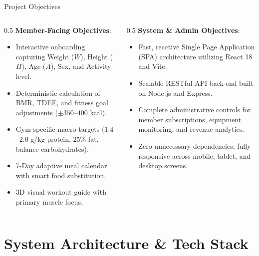 \documentclass[aspectratio=169,10pt]{beamer}
\begin{document}
\begin{frame}{Project Objectives}
  \begin{columns}[T]
    \begin{column}{0.5\textwidth}
      \textbf{Member-Facing Objectives}:
      \begin{itemize}
        \item Interactive onboarding capturing Weight ($W$), Height ($H$), Age ($A$), Sex, and Activity level.
        \item Deterministic calculation of BMR, TDEE, and fitness goal adjustments ($\pm 350$--$400$ kcal).
        \item Gym-specific macro targets ($1.4$--$2.0$ g/kg protein, $25\%$ fat, balance carbohydrates).
        \item 7-Day adaptive meal calendar with smart food substitution.
        \item 3D visual workout guide with primary muscle focus.
      \end{itemize}
    \end{column}
    \begin{column}{0.5\textwidth}
      \textbf{System \& Admin Objectives}:
      \begin{itemize}
        \item Fast, reactive Single Page Application (SPA) architecture utilizing React 18 and Vite.
        \item Scalable RESTful API back-end built on Node.js and Express.
        \item Complete administrative controls for member subscriptions, equipment monitoring, and revenue analytics.
        \item Zero unnecessary dependencies; fully responsive across mobile, tablet, and desktop screens.
      \end{itemize}
    \end{column}
  \end{columns}
\end{frame}

\section{System Architecture \& Tech Stack}
\end{document}
